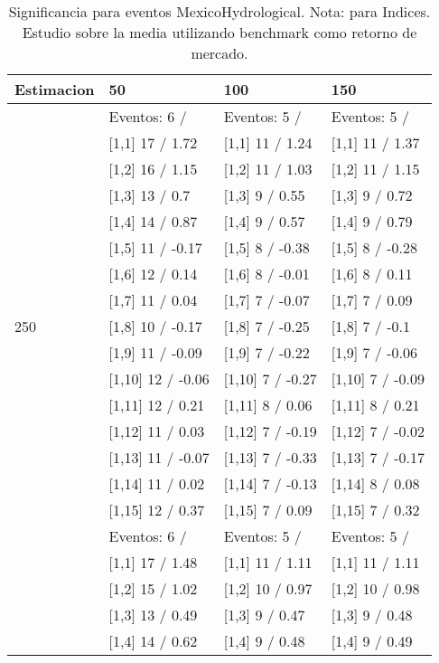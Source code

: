 \begin{table}

\caption{Significancia para eventos MexicoHydrological. Nota: para Indices. Estudio sobre la media utilizando benchmark como retorno de mercado.}
\centering
\begin{tabular}[t]{llll}
\toprule
Estimacion & 50 & 100 & 150\\
\midrule
 & Eventos:  6 / & Eventos:  5 / & Eventos:  5 /\\
 & {}[1,1] 17  / 1.72 & {}[1,1] 11  / 1.24 & {}[1,1] 11  / 1.37\\
 & {}[1,2] 16  / 1.15 & {}[1,2] 11  / 1.03 & {}[1,2] 11  / 1.15\\
 & {}[1,3] 13  / 0.7 & {}[1,3] 9  / 0.55 & {}[1,3] 9  / 0.72\\
 & {}[1,4] 14  / 0.87 & {}[1,4] 9  / 0.57 & {}[1,4] 9  / 0.79\\
\addlinespace
 & {}[1,5] 11  / -0.17 & {}[1,5] 8  / -0.38 & {}[1,5] 8  / -0.28\\
 & {}[1,6] 12  / 0.14 & {}[1,6] 8  / -0.01 & {}[1,6] 8  / 0.11\\
 & {}[1,7] 11  / 0.04 & {}[1,7] 7  / -0.07 & {}[1,7] 7  / 0.09\\
250 & {}[1,8] 10  / -0.17 & {}[1,8] 7  / -0.25 & {}[1,8] 7  / -0.1\\
 & {}[1,9] 11  / -0.09 & {}[1,9] 7  / -0.22 & {}[1,9] 7  / -0.06\\
\addlinespace
 & {}[1,10] 12  / -0.06 & {}[1,10] 7  / -0.27 & {}[1,10] 7  / -0.09\\
 & {}[1,11] 12  / 0.21 & {}[1,11] 8  / 0.06 & {}[1,11] 8  / 0.21\\
 & {}[1,12] 11  / 0.03 & {}[1,12] 7  / -0.19 & {}[1,12] 7  / -0.02\\
 & {}[1,13] 11  / -0.07 & {}[1,13] 7  / -0.33 & {}[1,13] 7  / -0.17\\
 & {}[1,14] 11  / 0.02 & {}[1,14] 7  / -0.13 & {}[1,14] 8  / 0.08\\
\addlinespace
 & {}[1,15] 12  / 0.37 & {}[1,15] 7  / 0.09 & {}[1,15] 7  / 0.32\\
 & Eventos:  6 / & Eventos:  5 / & Eventos:  5 /\\
 & {}[1,1] 17  / 1.48 & {}[1,1] 11  / 1.11 & {}[1,1] 11  / 1.11\\
 & {}[1,2] 15  / 1.02 & {}[1,2] 10  / 0.97 & {}[1,2] 10  / 0.98\\
 & {}[1,3] 13  / 0.49 & {}[1,3] 9  / 0.47 & {}[1,3] 9  / 0.48\\
\addlinespace
 & {}[1,4] 14  / 0.62 & {}[1,4] 9  / 0.48 & {}[1,4] 9  / 0.49\\

\end{tabular}
\end{table}
